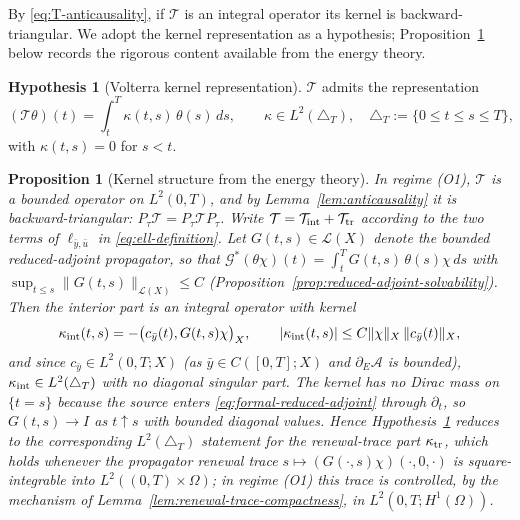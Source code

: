 \documentclass[pdflatex,sn-mathphys-num]{sn-jnl}
\theoremstyle{plain}
\newtheorem{proposition}[theorem]{Proposition}
\theoremstyle{definition}
\newtheorem{hypothesis}[theorem]{Hypothesis}
\theoremstyle{remark}
\begin{document}
By \eqref{eq:T-anticausality}, if $\mathcal T$ is an integral operator its
kernel is backward-triangular. We adopt the kernel representation as a
hypothesis; Proposition~\ref{prop:kernel-interior} below records the rigorous
content available from the energy theory.

\begin{hypothesis}[Volterra kernel representation]
\label{hyp:volterra-kernel}
$\mathcal T$ admits the representation
\begin{equation}
\label{eq:T-kernel}
(\mathcal T\theta)(t)=\int_t^T\kappa(t,s)\,\theta(s)\,ds,
\qquad
\kappa\in L^2(\triangle_T),\quad
\triangle_T:=\{0\le t\le s\le T\},
\end{equation}
with $\kappa(t,s)=0$ for $s<t$.
\end{hypothesis}

\begin{proposition}[Kernel structure from the energy theory]
\label{prop:kernel-interior}
In regime (O1), $\mathcal T$ is a bounded operator on $L^2(0,T)$, and by
Lemma~\ref{lem:anticausality} it is backward-triangular: $P_\tau\mathcal T=
P_\tau\mathcal T P_\tau$. Write $\mathcal T=\mathcal T_{\rm int}+
\mathcal T_{\rm tr}$ according to the two terms of $\ell_{\bar y,\bar u}$ in
\eqref{eq:ell-definition}. Let $G(t,s)\in\mathcal L(X)$ denote the bounded
reduced-adjoint propagator, so that
$\mathcal G^*(\theta\chi)(t)=\int_t^T G(t,s)\,\theta(s)\chi\,ds$ with
$\sup_{t\le s}\|G(t,s)\|_{\mathcal L(X)}\le C$
\textnormal{(Proposition~\ref{prop:reduced-adjoint-solvability})}. Then the
interior part is an integral operator with kernel
\begin{equation}
\label{eq:kappa-int}
\kappa_{\rm int}(t,s)=-\big(c_{\bar y}(t),G(t,s)\chi\big)_X,
\qquad
|\kappa_{\rm int}(t,s)|\le C\|\chi\|_X\,\|c_{\bar y}(t)\|_X ,
\end{equation}
and since $c_{\bar y}\in L^2(0,T;X)$ \textnormal{(as
$\bar y\in C([0,T];X)$ and $\partial_E\mathcal A$ is bounded)},
$\kappa_{\rm int}\in L^2(\triangle_T)$ with no diagonal singular part. The
kernel has no Dirac mass on $\{t=s\}$ because the source enters
\eqref{eq:formal-reduced-adjoint} through $\partial_t$, so $G(t,s)\to I$ as
$t\uparrow s$ with bounded diagonal values. Hence
Hypothesis~\ref{hyp:volterra-kernel} reduces to the corresponding
$L^2(\triangle_T)$ statement for the renewal-trace part $\kappa_{\rm tr}$,
which holds whenever the propagator renewal trace
$s\mapsto(G(\cdot,s)\chi)(\cdot,0,\cdot)$ is square-integrable into
$L^2((0,T)\times\Omega)$; in regime (O1) this trace is controlled, by the
mechanism of Lemma~\ref{lem:renewal-trace-compactness}, in
$L^2(0,T;H^1(\Omega))$.
\end{proposition}
\end{document}
